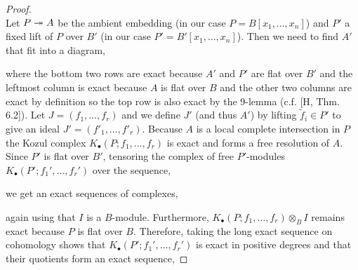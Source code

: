 \documentclass[12pt]{article}
\begin{document}
\begin{proof}
\bigskip\\
Let $P \twoheadrightarrow A$ be the ambient embedding (in our case $P = B[x_1, \dots, x_n]$) and $P'$ a fixed lift of $P$ over $B'$ (in our case $P' = B'[x_1, \dots, x_n]$). Then we need to find $A'$ that fit into a diagram,
\begin{center}
\end{center}
where the bottom two rows are exact because $A'$ and $P'$ are flat over $B'$ and the leftmost column is exact because $A$ is flat over $B$ and the other two columns are exact by definition so the top row is also exact by the 9-lemma (c.f. [H, Thm. 6.2]). Let $J = (f_1, \dots, f_r)$ and we define $J'$ (and thus $A'$) by lifting $\tilde{f}_i \in P'$ to give an ideal $J' = (f'_1, \dots, f'_r)$. Because $A$ is a local complete intersection in $P$ the Kozul complex $K_\bullet(P; f_1, \dots, f_r)$ is exact and forms a free resolution of $A$. Since $P'$ is flat over $B'$, tensoring the complex of free $P'$-modules $K_\bullet(P'; f_1', \dots, f_r')$ over the sequence,
\begin{center}
\end{center}
we get an exact sequences of complexes,
\begin{center}
\end{center}
again using that $I$ is a $B$-module. Furthermore, $K_\bullet(P; f_1, \dots, f_r) \otimes_{B} I$ remains exact because $P$ is flat over $B$. Therefore, taking the long exact sequence on cohomology shows that $K_\bullet(P'; f_1', \dots, f_r')$ is exact in positive degrees and that their quotients form an exact sequence,

\end{proof}
\end{document}
